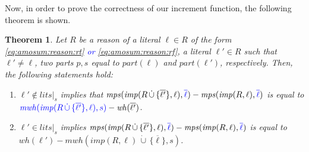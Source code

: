 \documentclass[preprint,authoryear]{elsarticle}
\newcommand{\lits}{\mathit{lits}}
\newcommand{\mwh}{\mathit{mwh}}
\newcommand{\wh}{\mathit{wh}}
\newcommand{\mps}{\mathit{mps}}
\newcommand{\cupdot}{\,\dot{\cup}\,}
\newtheorem{theorem}{Theorem}[section]
\theoremstyle{definition}
\begin{document}
Now, in order to prove the correctness of our increment function, the following theorem is shown.
\begin{theorem}
    \label{th:increment}
    Let $R$ be a reason of a literal $\ell \in R$ of the form \textcolor{blue}{ \eqref{eq:amosum:reason:rt} or \eqref{eq:amosum:reason:rf}}, a literal $\ell' \in R$ such that $\ell' \neq \ell$, two parts $p, s$ equal to $\mathit{part}(\ell)$ and $ \mathit{part}(\ell')$, respectively. Then, the following statements hold:
    \begin{enumerate}
        \item $\ell' \not\in \lits|_s $ implies that $\mps(\mathit{imp}(R \cupdot \{ {\overline{\ell'}} \}, \ell),\textcolor{blue}{\overline{\ell}}) - \mps(\mathit{imp}(R,\ell), \textcolor{blue}{\overline{\ell}}) $ is equal to $ \textcolor{blue}{\mwh(\mathit{imp}(R \cupdot \{ {\overline{\ell'}} \},\ell), s)} - \wh(\overline{\ell'})$.
        \item $\ell' \in \lits|_s $ implies $ \mps(\mathit{imp}(R \cupdot \{ {\overline{\ell'}} \}, \ell),\textcolor{blue}{\overline{\ell}}) - \mps(\mathit{imp}(R,\ell), \textcolor{blue}{\overline{\ell}}) $ is equal to $ \wh(\ell') - \mwh(\mathit{imp}(R,\ell) \cupdot \{\overline{\ell}\}, s)$.
    \end{enumerate}
\end{theorem}
\end{document}
